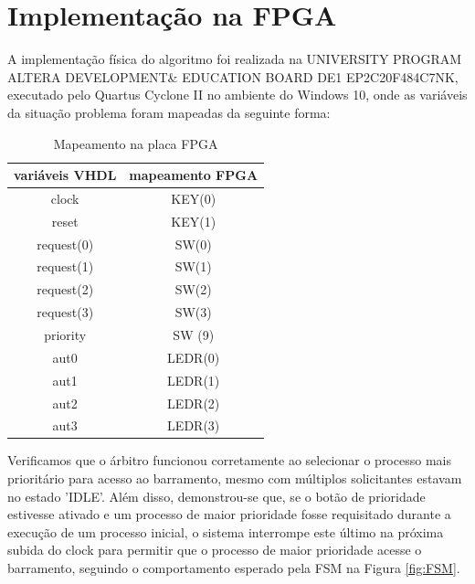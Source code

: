 \documentclass[oneside]{uffstex}
\begin{document}
\section{Implementação na FPGA}
A implementação física do algoritmo foi realizada na UNIVERSITY PROGRAM ALTERA DEVELOPMENT\& EDUCATION BOARD DE1 EP2C20F484C7NK, executado pelo Quartus Cyclone II  no ambiente do Windows 10, onde as variáveis da situação problema foram mapeadas da seguinte forma:
\begin{table}[H]
    \centering
    \begin{tabular}{|c|c|}
    \hline
        variáveis VHDL & mapeamento FPGA \\
        \hline        
        clock & KEY(0) \\
        \hline
        reset & KEY(1) \\         
        \hline
        request(0) & SW(0) \\
        \hline
        request(1) & SW(1) \\ 
        \hline
        request(2) & SW(2) \\ 
        \hline
        request(3) & SW(3) \\         
        \hline
        priority & SW (9) \\
        \hline
        aut0 & LEDR(0) \\ 
        \hline
        aut1 & LEDR(1) \\
        \hline
        aut2 & LEDR(2) \\
        \hline
        aut3 & LEDR(3) \\
        \hline
    \end{tabular}
    \caption{Mapeamento na placa FPGA}
    \label{tab:mapeamento}
\end{table}
Verificamos que o árbitro funcionou corretamente ao selecionar o processo mais prioritário para acesso ao barramento, mesmo com múltiplos solicitantes estavam no estado 'IDLE'. Além disso, demonstrou-se que, se o botão de prioridade estivesse ativado e um processo de maior prioridade fosse requisitado durante a execução de um processo inicial, o sistema interrompe este último na próxima subida do clock para permitir que o processo de maior prioridade acesse o barramento, seguindo o comportamento esperado pela FSM na Figura \ref{fig:FSM}.
\end{document}
